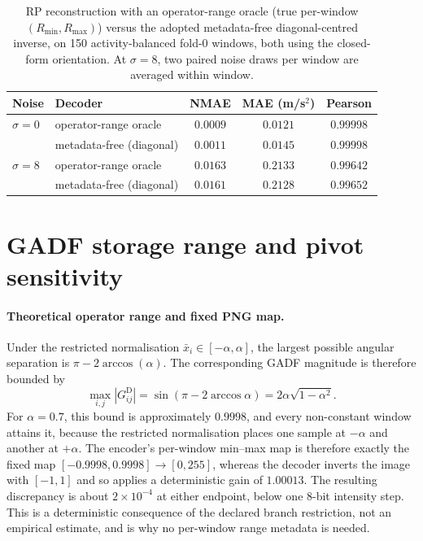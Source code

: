 \documentclass[10pt,a4paper,parskip=half-]{scrartcl}
\begin{document}
\begin{table}[H]
\centering
\caption{RP reconstruction with an operator-range oracle (true per-window $(R_{\min},R_{\max})$) versus the adopted metadata-free diagonal-centred inverse, on 150 activity-balanced fold-0 windows, both using the closed-form orientation. At $\sigma=8$, two paired noise draws per window are averaged within window.}
\label{tab:supp_rp_metadatafree}
\small
\begin{tabular}{llccc}
\toprule
Noise & Decoder & NMAE & MAE (m/s$^2$) & Pearson \\
\midrule
$\sigma=0$ & operator-range oracle           & $0.0009$ & $0.0121$ & $0.99998$ \\
           & metadata-free (diagonal)      & $0.0011$ & $0.0145$ & $0.99998$ \\
$\sigma=8$ & operator-range oracle           & $0.0163$ & $0.2133$ & $0.99642$ \\
           & metadata-free (diagonal)      & $0.0161$ & $0.2128$ & $0.99652$ \\
\bottomrule
\end{tabular}
\end{table}

\section{GADF storage range and pivot sensitivity}

\paragraph*{Theoretical operator range and fixed PNG map.}
Under the restricted normalisation $\bar x_i\in[-\alpha,\alpha]$, the largest possible angular separation is $\pi-2\arccos(\alpha)$. The corresponding GADF magnitude is therefore bounded by
\[
\max_{i,j}|G^{\mathrm D}_{ij}|
=\sin\!\left(\pi-2\arccos\alpha\right)
=2\alpha\sqrt{1-\alpha^2}.
\]
For $\alpha=0.7$, this bound is approximately $0.9998$, and every non-constant window attains it, because the restricted normalisation places one sample at $-\alpha$ and another at $+\alpha$. The encoder's per-window min--max map is therefore exactly the fixed map $[-0.9998,0.9998]\to[0,255]$, whereas the decoder inverts the image with $[-1,1]$ and so applies a deterministic gain of $1.00013$. The resulting discrepancy is about $2\times10^{-4}$ at either endpoint, below one 8-bit intensity step. This is a deterministic consequence of the declared branch restriction, not an empirical estimate, and is why no per-window range metadata is needed.
\end{document}

